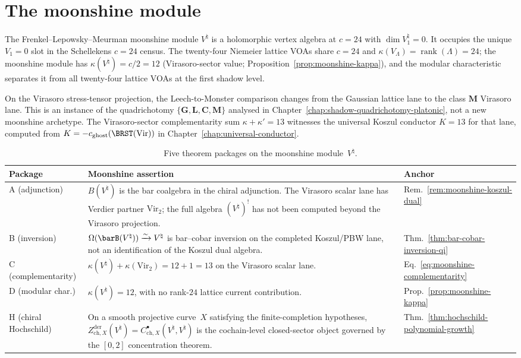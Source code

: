 
\chapter{The moonshine module}\label{chap:moonshine}\label{ch:moonshine}

The Frenkel--Lepowsky--Meurman moonshine module $V^\natural$
\cite{FLM88} is a holomorphic vertex algebra at $c = 24$ with
$\dim V_1^\natural = 0$. It occupies the unique $V_1=0$ slot in the
Schellekens $c=24$ census.
The twenty-four Niemeier lattice VOAs share $c = 24$ and
$\kappa(V_\Lambda) = \operatorname{rank}(\Lambda) = 24$; the
moonshine module has $\kappa(V^\natural) = c/2 = 12$
\textup{(}Virasoro-sector value;
Proposition~\ref{prop:moonshine-kappa}\textup{)}, and the modular
characteristic separates it from all twenty-four lattice VOAs at
the first shadow level.

On the Virasoro stress-tensor projection, the Leech-to-Monster
comparison changes from the Gaussian lattice lane to the class
$\mathbf{M}$ Virasoro lane. This is an instance of the
quadrichotomy $\{\mathbf{G},\mathbf{L},\mathbf{C},\mathbf{M}\}$
analysed in Chapter~\ref{chap:shadow-quadrichotomy-platonic}, not a
new moonshine archetype. The Virasoro-sector complementarity sum
$\kappa+\kappa' = 13$ witnesses the universal Koszul conductor
$K = 13$ for that lane, computed from
$K=-c_{\mathrm{ghost}}(\BRST(\mathrm{Vir}))$ in
Chapter~\ref{chap:universal-conductor}.

\begin{table}[ht]
\centering
\small
\caption{Five theorem packages on the moonshine
module~$V^\natural$.}\label{tab:moonshine-five-theorems}
\begin{tabular}{p{2.4cm}p{8.6cm}p{3.2cm}}
\toprule
\textbf{Package} & \textbf{Moonshine assertion} & \textbf{Anchor} \\
\midrule
A (adjunction) &
 $B(V^\natural)$ is the bar coalgebra in the chiral adjunction. The
 Virasoro scalar lane has Verdier partner $\mathrm{Vir}_2$; the full
 algebra $(V^\natural)^!$ has not been computed beyond the
 Virasoro projection.
 & Rem.~\ref{rem:moonshine-koszul-dual} \\
B (inversion) &
 $\Omega(\barB(V^\natural))\xrightarrow{\sim}V^\natural$ is
 bar--cobar inversion on the completed Koszul/PBW lane, not an
 identification of the Koszul dual algebra.
 & Thm.~\ref{thm:bar-cobar-inversion-qi} \\
C (complementarity) &
 $\kappa(V^\natural)+\kappa(\mathrm{Vir}_2)=12+1=13$ on the
 Virasoro scalar lane.
 & Eq.~\eqref{eq:moonshine-complementarity} \\
D (modular char.) &
 $\kappa(V^\natural)=12$, with no rank-$24$ lattice current
 contribution.
 & Prop.~\ref{prop:moonshine-kappa} \\
H (chiral Hochschild) &
On a smooth projective curve~$X$ satisfying the finite-completion
hypotheses, $Z_{\mathrm{ch},X}^{\mathrm{der}}(V^\natural)
=C^\bullet_{\mathrm{ch},X}(V^\natural,V^\natural)$ is the
cochain-level closed-sector object governed by the $[0,2]$
concentration theorem.
 & Thm.~\ref{thm:hochschild-polynomial-growth} \\
\bottomrule
\end{tabular}
\end{table}

